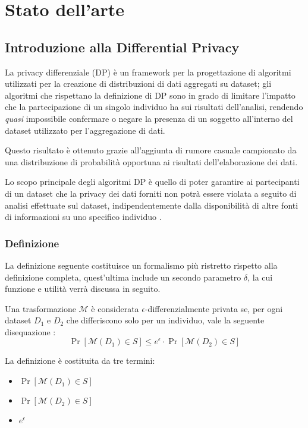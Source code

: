 \chapter{Stato dell'arte}
\section{Introduzione alla Differential Privacy}
La privacy differenziale (DP) è un framework per la progettazione di algoritmi utilizzati per la creazione di distribuzioni di dati aggregati su dataset; gli algoritmi che rispettano la definizione di DP sono in grado di limitare l'impatto che la partecipazione di un singolo individuo ha sui risultati dell'analisi, rendendo \textit{quasi} impossibile confermare o negare la presenza di un soggetto all'interno del dataset utilizzato per l'aggregazione di dati.

Questo risultato è ottenuto grazie all'aggiunta di rumore casuale campionato da una distribuzione di probabilità opportuna ai risultati dell'elaborazione dei dati.

Lo scopo principale degli algoritmi DP è quello di poter garantire ai partecipanti di un dataset che la privacy dei dati forniti non potrà essere violata a seguito di analisi effettuate sul dataset, indipendentemente dalla disponibilità di altre fonti di informazioni su uno specifico individuo \cite[p.~5]{TCS-042}.

\subsection{Definizione}
La definizione seguente costituisce un formalismo più ristretto rispetto alla definizione completa, quest'ultima include un secondo parametro $\mathcal{\delta}$, la cui funzione e utilità verrà discussa in seguito.

Una trasformazione $\mathcal{M}$ è considerata $\epsilon$-differenzialmente privata se, per ogni dataset $D_1$ e $D_2$ che differiscono solo per un individuo, vale la seguente disequazione \cite{10.1007/11681878_14}:
\begin{equation}
  \Pr[\mathcal{M}(D_1) \in S] \leq e^{\epsilon} \cdot \Pr[\mathcal{M}(D_2) \in S]
  \label{eq:differential_privacy}
\end{equation}

La definizione è costituita da tre termini:
\begin{itemize}
    \item $\Pr[\mathcal{M}(D_1) \in S]$
    \item $\Pr[\mathcal{M}(D_2) \in S]$
    \item $e^\epsilon$
\end{itemize}
